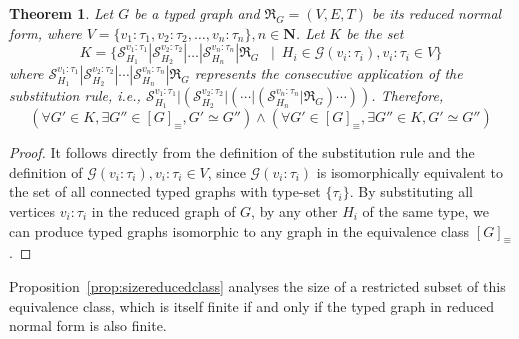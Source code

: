 \documentclass[preprint,12pt]{elsarticle}
\theoremstyle{plain}
\newtheorem{theorem}{Theorem}[section]
\newcommand\tyv[2]{#1\!\!:\!\!#2}
\begin{document}
\begin{theorem}\label{theorem:isEquivClass}
Let $G$ be a typed graph and $\Re_G = (V,E,T)$ be its reduced normal form, where $V = \{\tyv{v_1}{\tau_1}, \tyv{v_2}{\tau_2}, \ldots, \tyv{v_n}{\tau_n}\}, n\in \mathbf{N}$.
Let $K$ be the set
\[
K = \{ \mathcal{S}^{{v_1}:{\tau_1}}_{H_1}|\mathcal{S}^{{v_2}:{\tau_2}}_{H_2}|\dots|\mathcal{S}^{{v_n}:{\tau_n}}_{H_n}|\Re_G
             \,\,\,\,\,|\,\,\,   H_i\in\mathcal{G}(\tyv{v_i}{\tau_i}),\tyv{v_i}{\tau_i}\in V\}
\]
where $\mathcal{S}^{{v_1}:{\tau_1}}_{H_1}|\mathcal{S}^{{v_2}:{\tau_2}}_{H_2}|\cdots|\mathcal{S}^{{v_n}:{\tau_n}}_{H_n}|\Re_G$
represents the consecutive application of the substitution rule, i.e.,
$\mathcal{S}^{{v_1}:{\tau_1}}_{H_1}|\left(\mathcal{S}^{{v_2}:{\tau_2}}_{H_2}|\left(\cdots|\left(\mathcal{S}^{{v_n}:{\tau_n}}_{H_n}|\Re_G\right)\cdots\right)\right)$.
Therefore,
\[
(\forall G'\in K, \exists G''\in[G]_\equiv, G'\simeq G'') \wedge
(\forall G'\in[G]_\equiv, \exists G''\in K, G'\simeq G'')
\]
\end{theorem}
\begin{proof}
It follows directly from the definition of the substitution rule and the definition of $\mathcal{G}(\tyv{v_i}{\tau_i}),\tyv{v_i}{\tau_i}\in V$,
since $\mathcal{G}(\tyv{v_i}{\tau_i})$ is isomorphically equivalent to the set of all connected typed graphs with type-set $\{\tau_i\}$.
By substituting all vertices $\tyv{v_i}{\tau_i}$ in the reduced graph of $G$,
by any other $H_i$ of the same type, we can produce typed graphs isomorphic to
any graph in the equivalence class $[G]_\equiv$.
\end{proof}

Proposition~\ref{prop:sizereducedclass}
analyses the size of a restricted subset of this equivalence class,
which is itself finite if and only if the typed graph in reduced normal form is
also finite.
\end{document}

